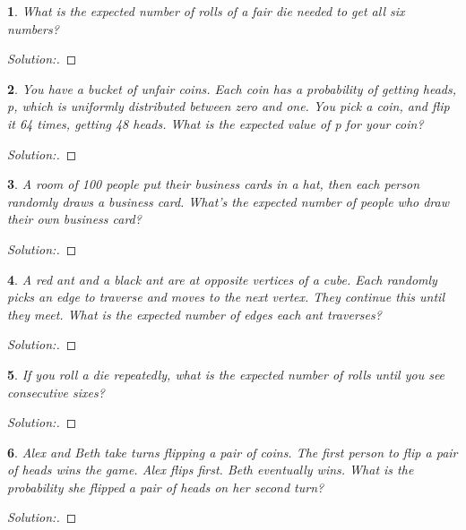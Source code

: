 \documentclass[10pt]{report}
\newtheorem{exe}{}[chapter]
\newenvironment{sol}{\begin{proof}[Solution:]}{\end{proof}}
\begin{document}
\begin{exe}
What is the expected number of rolls of a fair die needed to get all six
numbers?
\end{exe}
\begin{teacher}
\begin{sol}
\end{sol}
\end{teacher}

\begin{exe}
You have a bucket of unfair coins. Each coin has a probability of getting heads, p, which is uniformly distributed between zero and one. You pick a coin, and flip it 64 times, getting 48 heads. What is the expected value of p for your coin?
\end{exe}
\begin{teacher}
\begin{sol}
\end{sol}
\end{teacher}

\begin{exe}
A room of 100 people put their business cards in a hat, then each person randomly draws a business card. What's the expected number of people who draw their own business card?
\end{exe}
\begin{teacher}
\begin{sol}
\end{sol}
\end{teacher}

\begin{exe}
A red ant and a black ant are at opposite vertices of a cube. Each randomly picks an edge to traverse and moves to the next vertex. They continue this until they meet. What is the expected number of edges each ant traverses?
\end{exe}
\begin{teacher}
\begin{sol}
\end{sol}
\end{teacher}

\begin{exe}
If you roll a die repeatedly, what is the expected number of rolls until you see consecutive sixes?
\end{exe}
\begin{teacher}
\begin{sol}
\end{sol}
\end{teacher}

\begin{exe}
Alex and Beth take turns flipping a pair of coins. The first person to flip a pair of heads wins the game. Alex flips first. Beth eventually wins. What is the probability she flipped a pair of heads on her second turn?
\end{exe}
\begin{teacher}
\begin{sol}
\end{sol}
\end{teacher}
\end{document}
